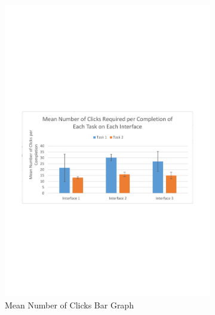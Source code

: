 \documentclass{l4proj}
\begin{document}
{\begin{figure}[H]
	\begin{subfigure}{.5\textwidth}
		\centering
		\includegraphics[width=\textwidth]{charts/table3.pdf}
		\caption{Mean Number of Clicks Bar Graph}
		\label{ch:meanclicksbargraph}
	\end{subfigure}
	\begin{subfigure}{.5\textwidth}
		\centering

\end{subfigure}
\end{figure}}
\end{document}
